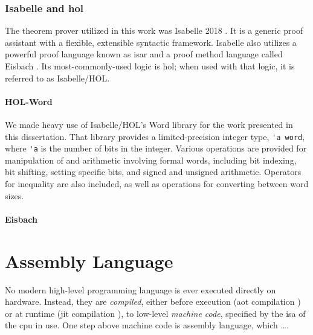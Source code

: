 \subsubsection{Isabelle and \acs*{hol}}
The theorem prover utilized in this work
was Isabelle 2018 \autocite{nipkow2002isabelle}.%
It is a generic proof assistant with a flexible, extensible syntactic framework.
Isabelle also utilizes a powerful proof language
known as \ac{isar}  \autocite{wenzel2007isabelle}
and a proof method language called Eisbach \autocite{matichuk2016eisbach}.
Its most-commonly-used logic is \ac{hol}; when used with that logic,
it is referred to as Isabelle/HOL.

\paragraph{HOL-Word}
We made heavy use of Isabelle/HOL's Word library \autocite{isabelle-word-session}
for the work presented in this dissertation.
That library provides a limited-precision integer type, \lstinline|'a word|,
where \lstinline|'a| is the number of bits in the integer.
Various operations are provided for manipulation of and arithmetic involving formal words,
including bit indexing, bit shifting, setting specific bits,
and signed and unsigned arithmetic.
Operators for inequality are also included,
as well as operations for converting between word sizes.

\paragraph{Eisbach}


%
%

\section{Assembly Language}\label{se:assembly_language}
No modern high-level programming language is ever executed directly on hardware.
Instead, they are \emph{compiled},%
either before execution (\ac{aot} compilation \autocite{})%
or at runtime (\ac{jit} compilation \autocite{}),
to low-level \emph{machine code}, specified by the \ac{isa} of the \ac{cpu} in use.
One step above machine code is assembly language,
which \todo\dots.


